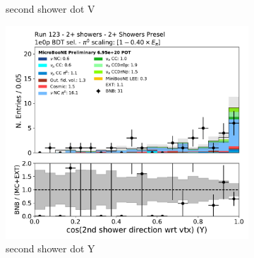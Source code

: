 \begin{figure}[H]
\begin{subfigure}{0.3\textwidth}
    \caption{second shower dot V}
    \end{subfigure}
    \begin{subfigure}{0.3\textwidth}
    \includegraphics[width=1.0\textwidth]{Sidebands/Figures/TwoShr_1e0pSel/BDT/secondshower_Y_dot.pdf}
    \caption{second shower dot Y}
    \end{subfigure}
    \caption{} 
    \label{fig:HE_1eNp_1}
\end{figure}


